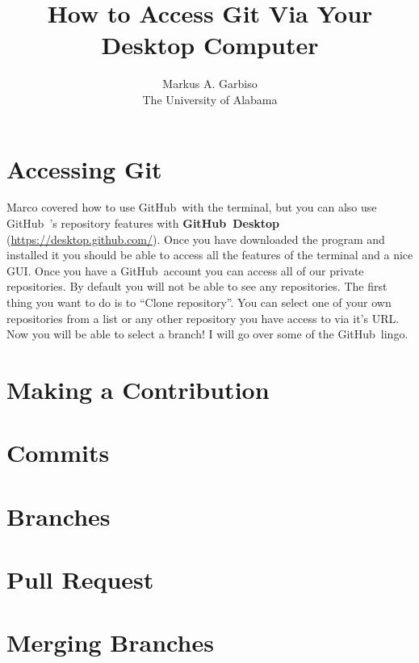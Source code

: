 \documentclass{article}
\title{How to Access Git Via Your Desktop Computer} %
\author{Markus A. Garbiso \\ The University of Alabama} %
\newcommand{\gh}{GitHub~}
\begin{document}
\maketitle

\section{Accessing Git}

Marco covered how to use \gh with the terminal, but you can also use \gh's repository features with \textbf{\gh Desktop} (\href{https://desktop.github.com/}{https://desktop.github.com/}). Once you have downloaded the program and installed it you should be able to access all the features of the terminal and a nice GUI. Once you have a \gh account you can access all of our private repositories. By default you will not be able to see any repositories. The first thing you want to do is to ``Clone repository''.  You can select one of your own repositories from a list or any other repository you have access to via it's URL. Now you will be able to select a branch! I will go over some of the \gh lingo.

\section{Making a Contribution}

\section{Commits}

\section{Branches}

\section{Pull Request}

\section{Merging Branches}
\end{document}
